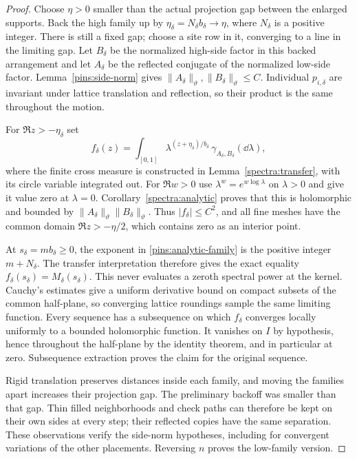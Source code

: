 \begin{proof}
Choose $\eta>0$ smaller than the actual projection gap between the
enlarged supports.  Back the high family up by
$\eta_\delta=N_\delta b_\delta\to\eta$, where $N_\delta$ is a
positive integer.  There is still a fixed gap; choose a site row in
it, converging to a line in the limiting gap.  Let $B_\delta$ be the
normalized high-side factor in this backed arrangement and let
$A_\delta$ be the reflected conjugate of the normalized low-side
factor.  Lemma~\ref{pins:side-norm} gives
$\|A_\delta\|_\vartheta,\|B_\delta\|_\vartheta\le C$.
Individual $p_{i,\delta}$ are invariant under lattice translation
and reflection, so their product is the same throughout the motion.

For $\Re z>-\eta_\delta$ set
\begin{equation}\label{pins:analytic-family}
 f_\delta(z)=\int_{[0,1]}
 \lambda^{(z+\eta_\delta)/b_\delta}\,
             \gamma_{A_\delta,B_\delta}(\dd\lambda),
\end{equation}
where the finite cross measure is constructed in
Lemma~\ref{spectra:transfer}, with its circle variable integrated out.
For $\Re w>0$ use $\lambda^w=e^{w\log\lambda}$ on $\lambda>0$
and give it value zero at $\lambda=0$.
Corollary~\ref{spectra:analytic} proves that this is holomorphic and
bounded by $\|A_\delta\|_\vartheta\|B_\delta\|_\vartheta$.
Thus $|f_\delta|\le C^2$, and all fine
meshes have the common domain $\Re z>-\eta/2$, which contains zero
as an interior point.

At $s_\delta=m b_\delta\ge0$, the exponent in
\eqref{pins:analytic-family} is the positive integer $m+N_\delta$.
The transfer interpretation therefore gives the exact equality
$f_\delta(s_\delta)=M_\delta(s_\delta)$.  This never evaluates a
zeroth spectral power at the kernel.  Cauchy's estimates give a
uniform derivative bound on compact subsets of the common half-plane,
so converging lattice roundings sample the same limiting function.
Every sequence has a subsequence on which $f_\delta$ converges locally
uniformly to a bounded holomorphic function.  It vanishes on $I$ by
hypothesis, hence throughout the half-plane by the identity theorem,
and in particular at zero.  Subsequence extraction proves the claim
for the original sequence.

Rigid translation preserves distances inside each family, and moving
the families apart increases their projection gap.  The preliminary
backoff was smaller than that gap.  Thin filled neighborhoods and
check paths can therefore be kept on their own sides at every step;
their reflected copies have the same separation.  These observations
verify the side-norm hypotheses, including for convergent variations of
the other placements.  Reversing $n$ proves the low-family version.
\end{proof}

